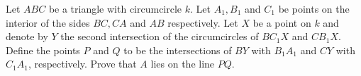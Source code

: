 Let $ABC$ be a triangle with circumcircle $k$.
Let $A_1,B_1$ and $C_1$ be points on the interior of the sides $BC,CA$ and $AB$ respectively.
Let $X$ be a point on $k$ and denote by $Y$ the second intersection of the circumcircles of $BC_1X$ and $CB_1X$.
Define the points $P$ and $Q$ to be the intersections of $BY$ with $B_1A_1$ and $CY$ with $C_1A_1$, respectively.
Prove that $A$ lies on the line $PQ$.
